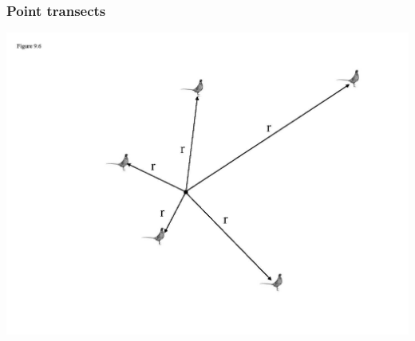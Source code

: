 \documentclass[color=usenames,dvipsnames,handout]{beamer}\usepackage[]{graphicx}\usepackage[]{xcolor}
\begin{document}
\begin{frame}
  \frametitle{Point transects}
  \includegraphics[width=\textwidth]{figs/fig9-8}
\end{frame}














\end{document}
